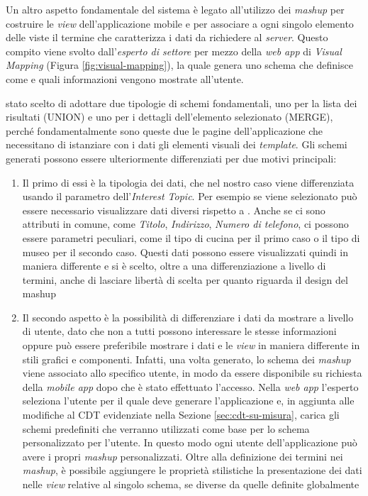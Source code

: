 Un altro aspetto fondamentale del sistema è legato all'utilizzo dei \emph{mashup} per costruire le \emph{view} dell'applicazione mobile e per associare a ogni singolo elemento delle viste il termine che caratterizza i dati da richiedere al \emph{server}. Questo compito viene svolto dall'\emph{esperto di settore} per mezzo della \emph{web app} di \emph{Visual Mapping} (Figura \ref{fig:visual-mapping}), la quale genera uno schema che definisce come e quali informazioni vengono mostrate all'utente.

\upe stato scelto di adottare due tipologie di schemi fondamentali, uno per la lista dei risultati (UNION) e uno per i dettagli dell'elemento selezionato (MERGE), perché fondamentalmente sono queste due le pagine dell'applicazione che necessitano di istanziare con i dati gli elementi visuali dei \emph{template}.
Gli schemi generati possono essere ulteriormente differenziati per due motivi principali:

\begin{enumerate}
	\item
	Il primo di essi è la tipologia dei dati, che nel nostro caso viene differenziata usando il parametro dell'\emph{Interest Topic}.
	Per esempio se viene selezionato  può essere necessario visualizzare dati diversi rispetto a . Anche se ci sono attributi in comune, come \emph{Titolo}, \emph{Indirizzo}, \emph{Numero di telefono}, ci possono essere parametri peculiari, come il tipo di cucina per il primo caso o il tipo di museo per il secondo caso. Questi dati possono essere visualizzati quindi in maniera differente e si è scelto, oltre a una differenziazione a livello di termini, anche di lasciare libertà di scelta per quanto riguarda il design del mashup
	\item
	Il secondo aspetto è la possibilità di differenziare i dati da mostrare a livello di utente, dato che non a tutti possono interessare le stesse informazioni oppure può essere preferibile mostrare i dati e le \emph{view} in maniera differente in stili grafici e componenti. Infatti, una volta generato, lo schema dei \emph{mashup} viene associato allo specifico utente, in modo da essere disponibile su richiesta della \emph{mobile app} dopo che è stato effettuato l'accesso.
	Nella \emph{web app} l'esperto seleziona l'utente per il quale deve generare l'applicazione e, in aggiunta alle modifiche al CDT evidenziate nella Sezione \ref{sec:cdt-su-misura}, carica gli schemi predefiniti che verranno utilizzati come base per lo schema personalizzato per l'utente. In questo modo ogni utente dell'applicazione può avere i propri \emph{mashup} personalizzati.
	Oltre alla definizione dei termini nei \emph{mashup}, è possibile aggiungere le proprietà stilistiche la presentazione dei dati nelle \emph{view} relative al singolo schema, se diverse da quelle definite globalmente
\end{enumerate}

